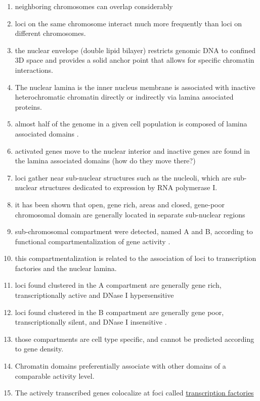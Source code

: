 \documentclass[12pt]{book}
\begin{document}
\begin{enumerate}
 \itemsep1pt  \parskip1pt 
\item neighboring chromosomes can overlap considerably 
\item loci on the same chromosome interact much more frequently than loci on different chromosomes. 
\item the nuclear envelope (double lipid bilayer) restricts genomic DNA to confined 3D space and provides a solid anchor point that allows for specific chromatin interactions. 
\item The nuclear lamina is the inner nucleus membrane is associated with inactive heterochromatic chromatin directly or indirectly via lamina associated proteins.
\item almost half of the genome in a given cell population is composed of lamina associated domains \cite{guelen2008domain}. 
\item activated genes move to the nuclear interior and inactive genes are found in the lamina associated domains (how do they move there?)
\item loci gather near sub-nuclear structures such as the nucleoli, which are sub-nuclear structures dedicated to expression by RNA polymerase I. 
\item it has been shown that open, gene rich, areas and closed, gene-poor chromosomal domain are generally located in separate sub-nuclear regions \cite{fraser2007nuclear}
\item sub-chromosomal compartment were detected, named A and B, according to functional compartmentalization of gene activity \cite{lieberman2009comprehensive}. 
\item this compartmentalization is related to the association of loci to transcription factories and the nuclear lamina.  
\item loci found clustered in the A compartment are generally gene rich, transcriptionally active and DNase I hypersensitive 
\item loci found clustered in the B compartment are generally gene poor, transcriptionally silent, and DNase I insensitive \cite{lieberman2009comprehensive}.
\item those compartments are cell type specific, and cannot be predicted according to gene density. 
\item Chromatin domains preferentially associate with other domains of a comparable activity level.
\item The actively transcribed genes colocalize at foci called \href{http://en.wikipedia.org/wiki/Transcription_factories}{transcription factories}

\end{enumerate}
\end{document}
